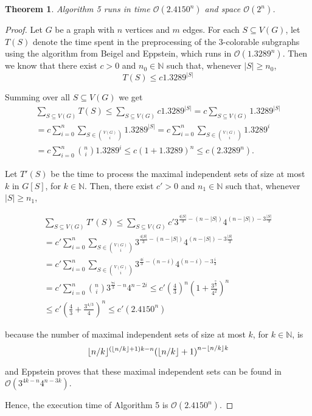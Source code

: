 \documentclass[fleqn,10pt]{SelfArx} %
\DeclarePairedDelimiter\floor{\lfloor}{\rfloor}
\newtheorem{teor}{Theorem}
\newcommand{\parenteses}[1] {\ensuremath{\left ( {#1} \right )}}
\newcommand{\cO}{\mathcal{O}}
\newcommand{\bN}{\ensuremath{\mathbb{N}}}
\begin{document}
	\begin{teor}Algorithm 5 runs in time
		$\cO(2.4150^n)$ and space $\cO(2^n)$. \label{teo:epps}
	\end{teor}
	
	\begin{proof}
		
		Let $G$ be a graph with $n$ vertices and $m$ edges. For
		each $S \subseteq V(G)$, let $T(S)$ denote the time spent in the preprocessing of the 3-colorable subgraphs using the algorithm from Beigel and Eppstein\cite{BeigelEppstein05}, which runs in $\cO(1.3289^n)$. Then we know that there
		exist $c > 0$ and $n_{0} \in \bN$ such that, whenever $|S| \geq
		n_{0}$, 
		\begin{equation*}
		T(S) \leq c 1.3289^{|S|}
		\end{equation*}
		
		Summing over all $S \subseteq V(G)$ we get
		\begin{multline*}
		\sum_{S \subseteq V(G)} T(S)
		\leq
		\sum_{S \subseteq V(G)} c 1.3289^{|S|}
		=
		c \sum_{S \subseteq V(G)} 1.3289^{|S|} \\
		=
		c \sum_{i=0}^{n} \sum_{S \in \binom{V(G)}{i}} 1.3289^{|S|} 
		=
		c \sum_{i=0}^{n} \sum_{S \in \binom{V(G)}{i}} 1.3289^i \\
		=
		c \sum_{i=0}^{n} \binom{n}{i} 1.3289^i 
		\leq
		c \parenteses{1+1.3289}^{n} 
		\leq 
		c \parenteses{2.3289^n}.
		\end{multline*}
		
		Let $T'(S)$ be the time to process the maximal independent sets of size at most $k$ in $G[S]$, for $k \in \bN$. Then, there exist $c'>0$ and $n_1 \in \bN$ such that, whenever $|S| \geq n_1$, 
		
		\begin{multline*}
		\sum_{S \subseteq V(G)} T'(S)
		\leq
		\sum_{S \subseteq V(G)} c' 3^{\frac{4|S|}{3}-(n-|S|)}4^{(n-|S|)-3\frac{|S|}{3}} \\
		=
		c' \sum_{i=0}^{n} \sum_{S \in \binom{V(G)}{i}} 3^{\frac{4|S|}{3}-(n-|S|)}4^{(n-|S|)-3\frac{|S|}{3}} \\
		=
		c' \sum_{i=0}^{n} \sum_{S \in \binom{V(G)}{i}} 3^{\frac{4i}{3}-(n-i)}4^{(n-i)-3\frac{i}{3}} \\
		=
		c' \sum_{i=0}^{n} \binom{n}{i} 3^{\frac{7i}{3}-n}4^{n-2i} 
		\leq
		c' \parenteses{\frac{4}{3}}^n \parenteses{1+\frac{3^{\frac{7}{3}}}{4^2}}^{n} \\
		\leq 
		c' \parenteses{\frac{4}{3}+\frac{3^{4/3}}{4}}^{n}
		\leq
		c'(2.4150^n)
		\end{multline*}
		
		because the number of maximal independent sets of size at most $k$, for $k \in \bN$, is
		\begin{equation*}
		\floor{n/k}^{(\floor{n/k}+1)k-n}{(\floor{n/k}+1)}^{n-\floor{n/k}k}
		\end{equation*}
		
		and Eppstein\cite{Eppstein03} proves that these maximal independent sets can
		be found in $\cO(3^{4k-n}4^{n-3k})$.
		
		Hence, the execution time of Algorithm 5 is $\cO({2.4150^n})$.
		
	\end{proof}
	
\end{document}
